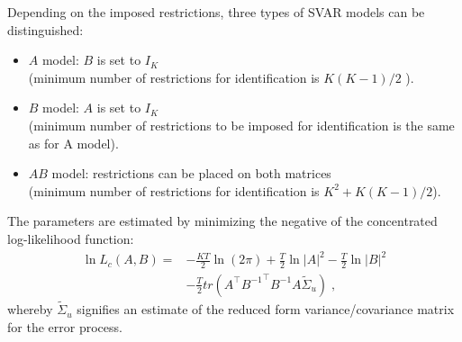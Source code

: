 \documentclass[nojss]{jss}
\begin{document}
Depending on the imposed restrictions, three types of SVAR models can
be distinguished: 
\begin{itemize}
\item $A$ model: $B$ is set to $I_K$ \\
  (minimum number of restrictions for identification is $K(K-1)/2$ ).
\item $B$ model: $A$ is set to $I_K$ \\
  (minimum number of restrictions to be imposed for identification is
  the same as for A model). 
\item $AB$ model: restrictions can be placed on both matrices \\
  (minimum number of restrictions for identification is $K^2 + K(K-1)/2$).
\end{itemize} 
The parameters are estimated by minimizing the negative of the
concentrated log-likelihood function: 
\begin{equation}
\label{eq9a}
\begin{split}
\ln L_c(A, B) = &- \frac{KT}{2}\ln(2\pi) + \frac{T}{2}\ln|A|^2
-\frac{T}{2}\ln|B|^2 \\ 
\; &- \frac{T}{2}tr(A^\top {B^{-1}}^\top B^{-1}A\tilde{\Sigma}_u) \; ,
\end{split}
\end{equation}
whereby $\tilde{\Sigma}_u$ signifies an estimate of the reduced form
variance/covariance matrix for the error process.
\end{document}
